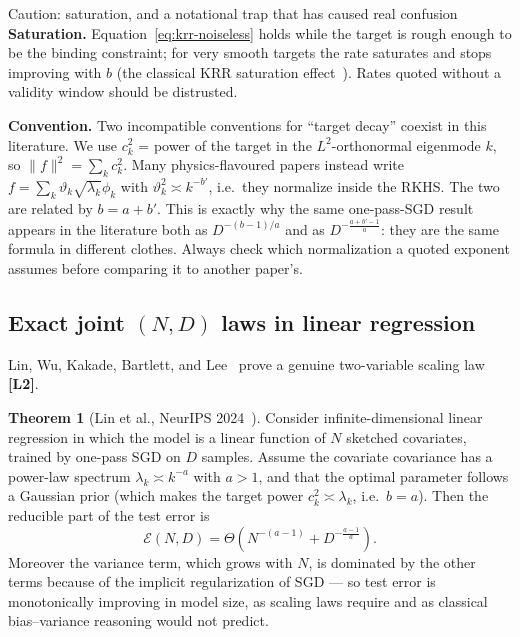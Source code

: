 \documentclass[11pt,a4paper]{article}
\theoremstyle{definition}
\newtheorem{theorem}{Theorem}[section]
\begin{document}
\begin{caution}{Caution: saturation, and a notational trap that has caused real confusion}
\textbf{Saturation.} Equation~\eqref{eq:krr-noiseless} holds while the target is rough enough to be the binding constraint; for very smooth targets the rate saturates and stops improving with $b$ (the classical KRR saturation effect~\cite{cui2021generalization}). Rates quoted without a validity window should be distrusted.

\textbf{Convention.} Two incompatible conventions for ``target decay'' coexist in this literature. We use $c_k^2$ = power of the target in the $L^2$-orthonormal eigenmode $k$, so $\|f\|^2 = \sum_k c_k^2$. Many physics-flavoured papers instead write $f=\sum_k \vartheta_k\sqrt{\lambda_k}\phi_k$ with $\vartheta_k^2\asymp k^{-b'}$, i.e.\ they normalize inside the RKHS. The two are related by $b = a + b'$. This is exactly why the same one-pass-SGD result appears in the literature both as $D^{-(b-1)/a}$ and as $D^{-\frac{a+b'-1}{a}}$: they are the same formula in different clothes. Always check which normalization a quoted exponent assumes before comparing it to another paper's.
\end{caution}

\subsection{Exact joint $(N,D)$ laws in linear regression}
\label{subsec:lin_scaling}

Lin, Wu, Kakade, Bartlett, and Lee~\cite{lin2024scaling} prove a genuine two-variable scaling law \textbf{[L2]}.

\begin{theorem}[Lin et al., NeurIPS 2024~\cite{lin2024scaling}]
Consider infinite-dimensional linear regression in which the model is a linear function of $N$ sketched covariates, trained by one-pass SGD on $D$ samples. Assume the covariate covariance has a power-law spectrum $\lambda_k\asymp k^{-a}$ with $a>1$, and that the optimal parameter follows a Gaussian prior (which makes the target power $c_k^2\asymp\lambda_k$, i.e.\ $b=a$). Then the reducible part of the test error is
\begin{equation}
  \boxed{\mathcal{E}(N,D) = \Theta\!\left(N^{-(a-1)} + D^{-\frac{a-1}{a}}\right)} .
  \label{eq:lin}
\end{equation}
Moreover the variance term, which grows with $N$, is dominated by the other terms because of the implicit regularization of SGD --- so test error is monotonically improving in model size, as scaling laws require and as classical bias--variance reasoning would not predict.
\end{theorem}
\end{document}
